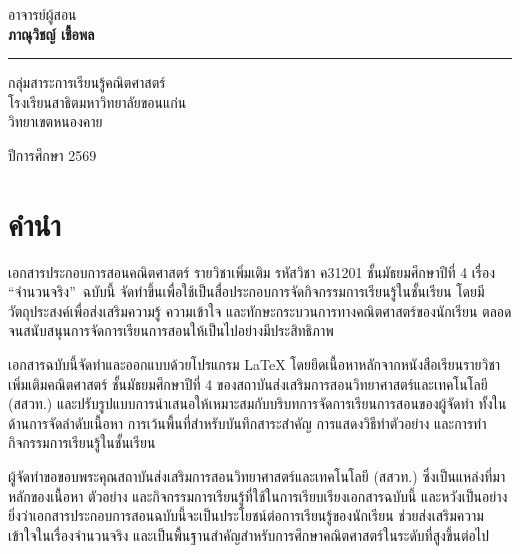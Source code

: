 \documentclass[a4paper,oneside,12pt]{book}
\begin{document}
\begin{titlepage}
\begin{minipage}{0.8\textwidth}
		{\large อาจารย์ผู้สอน}\\[0.5cm]
		
		{\huge\bfseries ภาณุวิชญ์ เชื้อพล}\\[0.4cm]
		
		\color{coverblue}
		\rule{0.6\textwidth}{1.2pt}
		
		\vspace{0.5cm}
		
		{\large กลุ่มสาระการเรียนรู้คณิตศาสตร์}\\[0.15cm]
		
		{\large โรงเรียนสาธิตมหาวิทยาลัยขอนแก่น}\\[0.05cm]
		
		{\large วิทยาเขตหนองคาย}
	\end{minipage}
	
	\vfill
	
	{\large ปีการศึกษา 2569}
	
	\vspace*{0.8cm}

\end{titlepage}


\newpage
\thispagestyle{empty} %
\newpage

\chapter*{คำนำ}

เอกสารประกอบการสอนคณิตศาสตร์ รายวิชาเพิ่มเติม รหัสวิชา ค31201 ชั้นมัธยมศึกษาปีที่ 4 เรื่อง \textquotedblleft จำนวนจริง\textquotedblright\ ฉบับนี้ จัดทำขึ้นเพื่อใช้เป็นสื่อประกอบการจัดกิจกรรมการเรียนรู้ในชั้นเรียน โดยมีวัตถุประสงค์เพื่อส่งเสริมความรู้ ความเข้าใจ และทักษะกระบวนการทางคณิตศาสตร์ของนักเรียน ตลอดจนสนับสนุนการจัดการเรียนการสอนให้เป็นไปอย่างมีประสิทธิภาพ

เอกสารฉบับนี้จัดทำและออกแบบด้วยโปรแกรม \LaTeX{} โดยยึดเนื้อหาหลักจากหนังสือเรียนรายวิชาเพิ่มเติมคณิตศาสตร์ ชั้นมัธยมศึกษาปีที่ 4 ของสถาบันส่งเสริมการสอนวิทยาศาสตร์และเทคโนโลยี (สสวท.) และปรับรูปแบบการนำเสนอให้เหมาะสมกับบริบทการจัดการเรียนการสอนของผู้จัดทำ ทั้งในด้านการจัดลำดับเนื้อหา การเว้นพื้นที่สำหรับบันทึกสาระสำคัญ การแสดงวิธีทำตัวอย่าง และการทำกิจกรรมการเรียนรู้ในชั้นเรียน

ผู้จัดทำขอขอบพระคุณสถาบันส่งเสริมการสอนวิทยาศาสตร์และเทคโนโลยี (สสวท.) ซึ่งเป็นแหล่งที่มาหลักของเนื้อหา ตัวอย่าง และกิจกรรมการเรียนรู้ที่ใช้ในการเรียบเรียงเอกสารฉบับนี้ และหวังเป็นอย่างยิ่งว่าเอกสารประกอบการสอนฉบับนี้จะเป็นประโยชน์ต่อการเรียนรู้ของนักเรียน ช่วยส่งเสริมความเข้าใจในเรื่องจำนวนจริง และเป็นพื้นฐานสำคัญสำหรับการศึกษาคณิตศาสตร์ในระดับที่สูงขึ้นต่อไป
\end{document}

